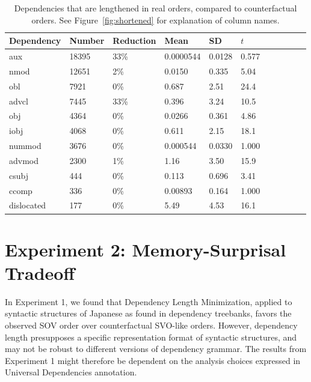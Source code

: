 \documentclass[11pt,a4paper]{article}
\begin{document}
\begin{table}
\begin{center}
\begin{tabular}{l|llllllllll}
   Dependency  &Number &Reduction     &  Mean   &   SD &       $t$ \\ \hline
  aux      &    18395  &  33\% &  0.0000544  &0.0128 &   0.577 \\
 nmod         &12651  &  2\%&  0.0150     &0.335  &   5.04  \\
 obl          & 7921  &  0\%     &  0.687      &2.51&     24.4   \\
  advcl        & 7445  &  33\% &  0.396      &3.24  &   10.5   \\
 obj          & 4364  &  0\%     &  0.0266     &0.361 &    4.86  \\
 iobj         & 4068  &  0\%    &  0.611      &2.15  &   18.1   \\
 nummod       & 3676  &  0\%     &  0.000544   &0.0330&    1.000 \\
 advmod       & 2300  &  1\%&  1.16       &3.50  &   15.9   \\
 csubj        &  444  &  0\%    &   0.113      &0.696 &    3.41  \\
 ccomp        &  336  &  0\%    &   0.00893    &0.164 &    1.000 \\
 dislocated   &  177  &  0\%    &   5.49       &4.53  &   16.1   \\
\end{tabular}
\end{center}
\caption{Dependencies that are lengthened in real orders, compared to counterfactual orders. See Figure~\ref{fig:shortened} for explanation of column names.}\label{fig:lengthened}
\end{table}



\section{Experiment 2: Memory-Surprisal Tradeoff}

In Experiment 1, we found that Dependency Length Minimization, applied to syntactic structures of Japanese as found in dependency treebanks, favors the observed SOV order over counterfactual SVO-like orders.
However, dependency length presupposes a specific representation format of syntactic structures, and may not be robust to different versions of dependency grammar.
The results from Experiment 1 might therefore be dependent on the analysis choices expressed in Universal Dependencies annotation.
\end{document}
